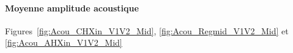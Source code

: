 \paragraph*{Moyenne amplitude acoustique} Figures~\ref{fig:Acou_CHXin_V1V2_Mid}, \ref{fig:Acou_Regmid_V1V2_Mid} et \ref{fig:Acou_AHXin_V1V2_Mid}
%    

%    

%    

